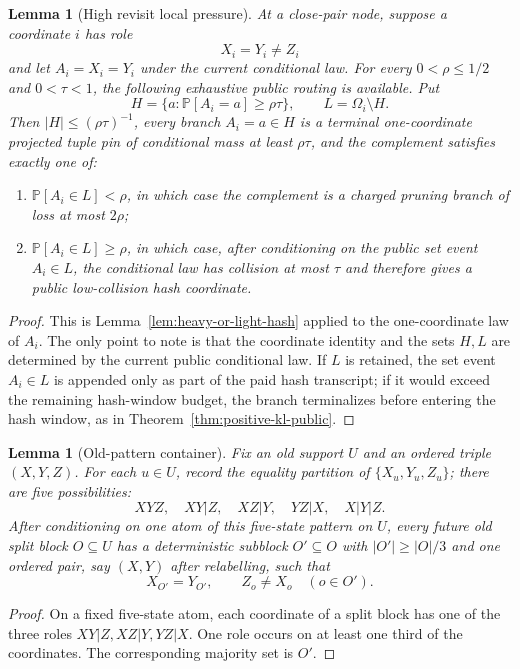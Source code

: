 \documentclass[11pt]{article}
\newtheorem{lemma}[theorem]{Lemma}
\newcommand{\Prb}{\mathbb P}
\begin{document}
\begin{lemma}[High revisit local pressure]
\label{lem:high-revisit}
At a close-pair node, suppose a coordinate $i$ has role
\[
  X_i=Y_i\ne Z_i
\]
and let $A_i=X_i=Y_i$ under the current conditional law.  For every
$0<\rho\le1/2$ and $0<\tau<1$, the following exhaustive public routing is
available.  Put
\[
  H=\{a:\Prb[A_i=a]\ge \rho\tau\},\qquad L=\Omega_i\setminus H .
\]
Then $|H|\le(\rho\tau)^{-1}$, every branch $A_i=a\in H$ is a terminal
one-coordinate projected tuple pin of conditional mass at least $\rho\tau$,
and the complement satisfies exactly one of:
\begin{enumerate}[label=\textup{(\roman*)}]
\item $\Prb[A_i\in L]<\rho$, in which case the complement is a charged pruning
branch of loss at most $2\rho$;
\item $\Prb[A_i\in L]\ge\rho$, in which case, after conditioning on the public
set event $A_i\in L$, the conditional law has collision at most $\tau$ and
therefore gives a public low-collision hash coordinate.
\end{enumerate}
\end{lemma}

\begin{proof}
This is Lemma~\ref{lem:heavy-or-light-hash} applied to the one-coordinate law
of $A_i$.  The only point to note is that the coordinate identity and the sets
$H,L$ are determined by the current public conditional law.  If $L$ is retained,
the set event $A_i\in L$ is appended only as part of the paid hash transcript;
if it would exceed the remaining hash-window budget, the branch terminalizes
before entering the hash window, as in Theorem~\ref{thm:positive-kl-public}.
\end{proof}

\begin{lemma}[Old-pattern container]
\label{lem:old-pattern-container}
Fix an old support $U$ and an ordered triple $(X,Y,Z)$.  For each
$u\in U$, record the equality partition of $\{X_u,Y_u,Z_u\}$; there are five
possibilities:
\[
  XYZ,\quad XY|Z,\quad XZ|Y,\quad YZ|X,\quad X|Y|Z.
\]
After conditioning on one atom of this five-state pattern on $U$, every
future old split block $O\subseteq U$ has a deterministic subblock
$O'\subseteq O$ with $|O'|\ge |O|/3$ and one ordered pair, say $(X,Y)$ after
relabelling, such that
\[
  X_{O'}=Y_{O'},\qquad Z_o\ne X_o\quad(o\in O').
\]
\end{lemma}

\begin{proof}
On a fixed five-state atom, each coordinate of a split block has one of the
three roles $XY|Z,XZ|Y,YZ|X$.  One role occurs on at least one third of the
coordinates.  The corresponding majority set is $O'$.
\end{proof}
\end{document}
